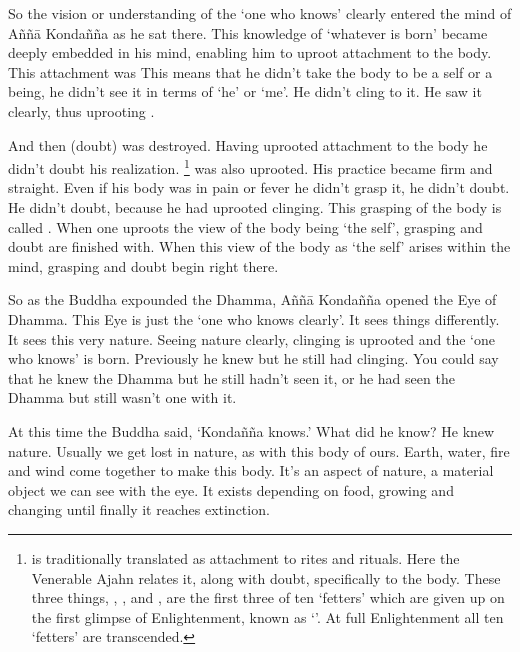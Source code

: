 So the vision or understanding of the `one who knows' clearly entered the mind of A\~n\~n\=a Konda\~n\~na as he sat there. This knowledge of `whatever is born' became deeply embedded in his mind, enabling him to uproot attachment to the body. This attachment was  This means that he didn't take the body to be a self or a being, he didn't see it in terms of `he' or `me'. He didn't cling to it. He saw it clearly, thus uprooting . 

And then  (doubt) was destroyed. Having uprooted attachment to the body he didn't doubt his realization. \footnote{ is traditionally translated as attachment to rites and rituals. Here the Venerable Ajahn relates it, along with doubt, specifically to the body. These three things, , , and , are the first three of ten `fetters' which are given up on the first glimpse of Enlightenment, known as `'. At full Enlightenment all ten `fetters' are transcended. } was also uprooted. His practice became firm and straight. Even if his body was in pain or fever he didn't grasp it, he didn't doubt. He didn't doubt, because he had uprooted clinging. This grasping of the body is called . When one uproots the view of the body being `the self', grasping and doubt are finished with. When this view of the body as `the self' arises within the mind, grasping and doubt begin right there. 

So as the Buddha expounded the Dhamma, A\~n\~n\=a Konda\~n\~na opened the Eye of Dhamma. This Eye is just the `one who knows clearly'. It sees things differently. It sees this very nature. Seeing nature clearly, clinging is uprooted and the `one who knows' is born. Previously he knew but he still had clinging. You could say that he knew the Dhamma but he still hadn't seen it, or he had seen the Dhamma but still wasn't one with it. 

At this time the Buddha said, `Konda\~n\~na knows.' What did he know? He knew nature. Usually we get lost in nature, as with this body of ours. Earth, water, fire and wind come together to make this body. It's an aspect of nature, a material object we can see with the eye. It exists depending on food, growing and changing until finally it reaches extinction. 


